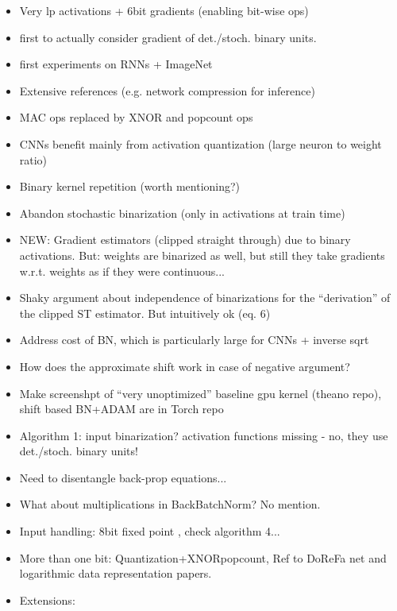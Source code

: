 \documentclass{article}
\begin{document}
    \begin{itemize}
        \item Very lp activations + 6bit gradients (enabling bit-wise ops)
        \item first to actually consider gradient of det./stoch. binary units.
        \item first experiments on RNNs + ImageNet
        \item Extensive references (e.g. network compression for inference)
        \item MAC ops replaced by XNOR and popcount ops
        \item CNNs benefit mainly from activation quantization (large neuron to
        weight ratio)
        \item Binary kernel repetition (worth mentioning?)
        \item Abandon stochastic binarization (only in activations at train time)
        \item NEW: Gradient estimators (clipped straight through) due to binary
        activations. But: weights are binarized as well, but still they take
        gradients w.r.t. weights as if they were continuous...
        \item Shaky argument about independence of binarizations for the
        ``derivation'' of the clipped ST estimator. But intuitively ok (eq. 6)
        \item Address cost of BN, which is particularly large for CNNs + inverse sqrt
        \item How does the approximate shift work in case of negative argument?
        \item Make screenshpt of ``very unoptimized'' baseline gpu kernel (theano repo),
        shift based BN+ADAM are in Torch repo
        \item Algorithm 1: input binarization? activation functions missing - no,
        they use det./stoch. binary units!
        \item Need to disentangle back-prop equations...
        \item What about multiplications in BackBatchNorm? No mention.
        \item Input handling: 8bit fixed point , check algorithm 4...
        \item More than one bit: Quantization+XNORpopcount, Ref to DoReFa net and
        logarithmic data representation papers.
        \item Extensions:
        \begin{itemize}

\end{itemize}
\end{itemize}
\end{document}

